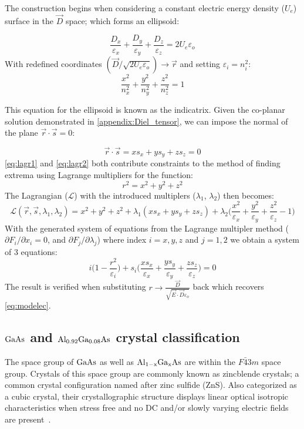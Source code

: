 The construction begins when considering a constant electric energy density ($U_e$) surface in the $\vec{D}$ space; which forms an ellipsoid: 

\begin{equation}\label{eq:lagr1}
\frac{D_x}{\varepsilon_x} + \frac{D_y}{\varepsilon_y} + \frac{D_z}{\varepsilon_z} = 2 U_e \varepsilon_o
\end{equation}
With redefined coordinates $(\vec{D}/\sqrt{2 U_e \varepsilon_o}) \rightarrow \vec{r}$ and setting $\varepsilon_i = n^2_i$:
\begin{equation}
\frac{x^2}{n_x^2} + \frac{y^2}{n_y^2} + \frac{z^2}{n_z^2} = 1
\end{equation}

This equation for the ellipsoid is known as the indicatrix. Given the co-planar solution demonstrated in \autoref{appendix:Diel_tensor}, we can impose the normal of the plane $\vec{r} \cdot \vec{s} = 0$:

\begin{equation}\label{eq:lagr2}
\vec{r} \cdot \vec{s} = x s_x + y s_y + z s_z = 0
\end{equation}
\autoref{eq:lagr1} and \autoref{eq:lagr2} both contribute constraints to the method of finding extrema using Lagrange multipliers for the function:
\begin{equation}
r^2 = x^2 + y^2 + z^2
\end{equation}
The Lagrangian ($\mathcal{L}$) with the introduced multiplers ($\lambda_1$, $\lambda_2$) then becomes:
\begin{equation}
\mathcal{L}(\vec{r},\vec{s},\lambda_1, \lambda_2) =
x^2 + y^2 + z^2 + \lambda_1 (xs_x + ys_y + zs_z) + \lambda_2 \bigg( \frac{x^2}{\varepsilon_x} + \frac{y^2}{\varepsilon_y} + \frac{z^2}{\varepsilon_z} - 1 \bigg)
\end{equation}
With the generated system of equations from the Lagrange multipler method ($\partial F_i/ \partial x_i = 0$, and $\partial F_j/ \partial \lambda_j$) where index $i =x,y,z$ and $j = 1,2$ we obtain a system of 3 equations:
\begin{equation}
i \bigg(1-\frac{r^2}{\varepsilon_{i}} \bigg) + s_{i} \bigg(\frac{x s_x}{\varepsilon_x} + \frac{y s_y}{\varepsilon_y} + \frac{z s_z}{\varepsilon_z} \bigg) = 0
\end{equation}
The result is verified when substituting $r \rightarrow \frac{\vec{D}}{\sqrt{\vec{E} \cdot \vec{D} \varepsilon_o}}$ back which recovers \autoref{eq:modelec}.
\\
\subsection{\texorpdfstring{$\mathrm{GaAs}$}{gaas} and \texorpdfstring{$\mathrm{Al_{0.92}Ga_{0.08}As}$}{algaas} crystal classification}
The space group of $\mathrm{GaAs}$ as well as $\mathrm{Al_{1-x}Ga_{x}As}$ are within the $F\bar{4}3m$ space group. Crystals of this space group are commonly known as zincblende crystals; a common crystal configuration named after zinc sulfide (ZnS). Also categorized as a cubic crystal, their crystallographic structure displays linear optical isotropic characteristics when stress free and no DC and/or slowly varying electric fields are present~\cite{boyd:2008}. 

